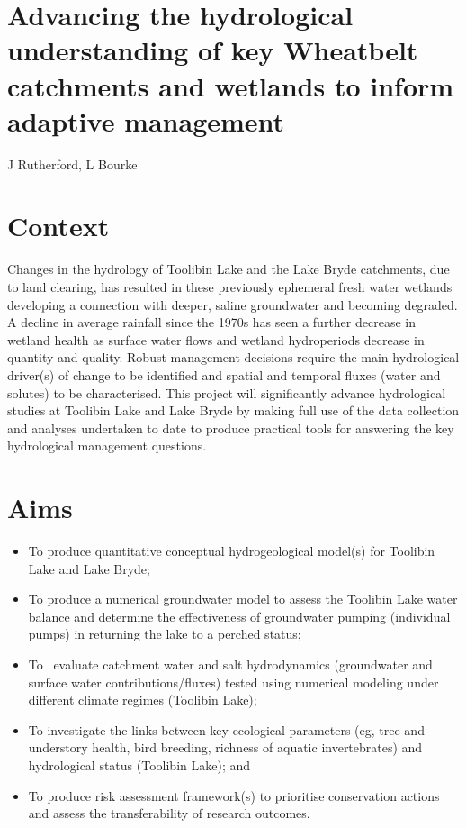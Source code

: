 \documentclass[version=last,
    paper=a4, %
    10pt, %
    usenames,
    dvipsnames,
    oneside, %
    headings=openany, %
    DIV=15 %
]{scrbook}
\begin{document}
\section*{Advancing the hydrological understanding of key Wheatbelt catchments and
wetlands to inform adaptive management
}

J Rutherford, L Bourke


\section*{Context}
Changes in the hydrology of Toolibin Lake and the Lake Bryde catchments,
due to land clearing, has resulted in these previously ephemeral fresh
water wetlands developing a connection with deeper, saline groundwater
and becoming degraded. A decline in average rainfall since the 1970s has
seen a further decrease in wetland health as surface water flows and
wetland hydroperiods decrease in quantity and quality. Robust management
decisions require the main hydrological driver(s) of change to be
identified and spatial and temporal fluxes (water and solutes) to be
characterised. This project will significantly advance hydrological
studies at Toolibin Lake and Lake Bryde by making full use of the data
collection and analyses undertaken to date to produce practical tools
for answering the key hydrological management questions.



\section*{Aims}
\begin{itemize}
\itemsep1pt\parskip0pt
\item
  To produce quantitative conceptual hydrogeological model(s) for
  Toolibin Lake and Lake Bryde;
\item
  To produce a numerical groundwater model to assess the Toolibin Lake
  water balance and determine the effectiveness of groundwater pumping
  (individual pumps) in returning the lake to a perched status;
\item
  To~ evaluate catchment water and salt hydrodynamics (groundwater and
  surface water contributions/fluxes) tested using numerical modeling
  under different climate regimes (Toolibin Lake);
\item
  To investigate the links between key ecological parameters (eg, tree
  and understory health, bird breeding, richness of aquatic
  invertebrates) and hydrological status (Toolibin Lake); and
\item
  To produce risk assessment framework(s) to prioritise conservation
  actions and assess the transferability of research outcomes.
\end{itemize}
\end{document}
